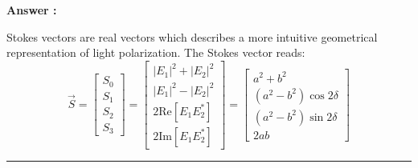 \documentclass[a4paper,11pt]{book}
\newcounter{qacount}
\newenvironment{answer}{
  \noindent\textbf{Answer \theqacount:}\space
}{
  \par\vspace{1em}   %
  \hrule             %
  \vspace{0.5em}     %
}
\begin{document}
\begin{answer}
    Stokes vectors are real vectors which describes a more intuitive geometrical representation of light polarization.
    The Stokes vector reads:
    \begin{equation}
        \vec{S} =
        \begin{bmatrix} S_0 \\ S_1 \\ S_2 \\ S_3
        \end{bmatrix} =
        \begin{bmatrix}
            |E_1|^2 + |E_2|^2       \\
            |E_1|^2 - |E_2|^2       \\
            2 \text{Re} [E_1 E_2^*] \\
            2 \text{Im} [E_1 E_2^*]
        \end{bmatrix} =
        \begin{bmatrix}
            a^2 + b^2                \\
            (a^2 - b^2) \cos 2\delta \\
            (a^2 - b^2) \sin 2\delta \\
            2ab
        \end{bmatrix}
    \end{equation}


\end{answer}
\end{document}
